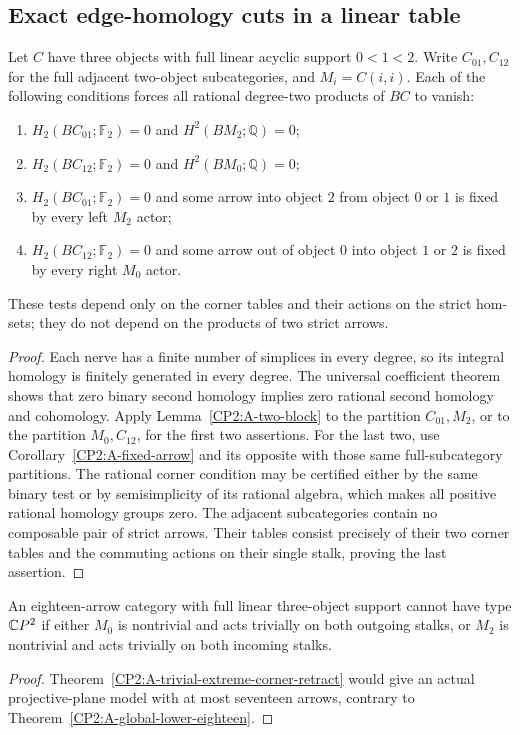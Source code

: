 \subsection{Exact edge-homology cuts in a linear table}

\begin{proposition}
\label{CP2:A-linear-adjacent-edge-homology-cuts}
Let $C$ have three objects with full linear acyclic
support $0<1<2$.  Write $C_{01},C_{12}$ for the full
adjacent two-object subcategories, and $M_i=C(i,i)$.
Each of the following conditions forces all rational
degree-two products of $BC$ to vanish:
\begin{enumerate}
\item $H_2(BC_{01};\mathbb F_2)=0$ and
      $H^2(BM_2;\mathbb Q)=0$;
\item $H_2(BC_{12};\mathbb F_2)=0$ and
      $H^2(BM_0;\mathbb Q)=0$;
\item $H_2(BC_{01};\mathbb F_2)=0$ and some arrow
      into object $2$ from object $0$ or $1$ is fixed
      by every left $M_2$ actor;
\item $H_2(BC_{12};\mathbb F_2)=0$ and some arrow
      out of object $0$ into object $1$ or $2$ is fixed
      by every right $M_0$ actor.
\end{enumerate}
These tests depend only on the corner tables and their
actions on the strict hom-sets; they do not depend on
the products of two strict arrows.
\end{proposition}
\begin{proof}
Each nerve has a finite number of simplices in every
degree, so its integral homology is finitely generated
in every degree.  The universal coefficient theorem
shows that zero binary second homology implies zero
rational second homology and cohomology.  Apply
Lemma~\ref{CP2:A-two-block} to the partition
$C_{01},M_2$, or to the partition $M_0,C_{12}$, for
the first two assertions.  For the last two, use
Corollary~\ref{CP2:A-fixed-arrow} and its opposite
with those same full-subcategory partitions.
The rational corner condition may be certified either
by the same binary test or by semisimplicity of its
rational algebra, which makes all positive rational
homology groups zero.
The adjacent subcategories contain no composable pair
of strict arrows.  Their tables consist precisely of
their two corner tables and the commuting actions on
their single stalk, proving the last assertion.
\end{proof}

\begin{corollary}
\label{CP2:A-linear-trivial-extreme-actions-eighteen}
An eighteen-arrow category with full linear three-object
support cannot have type $\mathbb{C}P^2$ if either $M_0$ is
nontrivial and acts trivially on both outgoing stalks,
or $M_2$ is nontrivial and acts trivially on both
incoming stalks.
\end{corollary}
\begin{proof}
Theorem~\ref{CP2:A-trivial-extreme-corner-retract}
would give an actual projective-plane model with at
most seventeen arrows, contrary to
Theorem~\ref{CP2:A-global-lower-eighteen}.
\end{proof}
